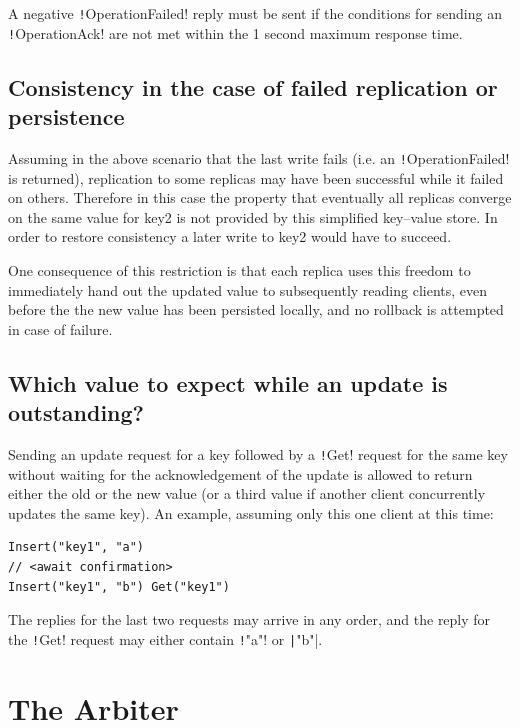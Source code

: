 \documentclass{article}
\begin{document}
A negative \texttt!OperationFailed! reply must be sent if the conditions for sending an \texttt!OperationAck! are not met within the 1 second maximum response time.

\subsection{Consistency in the case of failed replication or persistence}

Assuming in the above scenario that the last write fails (i.e. an \texttt!OperationFailed! is returned), replication to some replicas may have been successful while it failed on others. Therefore in this case the property that eventually all replicas converge on the same value for key2 is not provided by this simplified key–value store. In order to restore consistency a later write to key2 would have to succeed.

One consequence of this restriction is that each replica uses this  freedom to immediately hand out the updated value to subsequently  reading clients, even before the the new value has been persisted locally, and no rollback is attempted in case of failure.

\subsection{Which value to expect while an update is outstanding?}

Sending an update request for a key followed by a \texttt!Get! request for the same key without waiting for the acknowledgement of the update is allowed to return either the old or the new value (or a third value if another client concurrently updates the same key). An example, assuming only this one client at this time:

\begin{verbatim}
Insert("key1", "a")
// <await confirmation> 
Insert("key1", "b") Get("key1") 
\end{verbatim}

The replies for the last two requests may arrive in any order, and the reply for the \texttt!Get! request may either contain \texttt!"a"! or \texttt|"b"|.

\section{The Arbiter}\label{s:arbiter}
\end{document}
